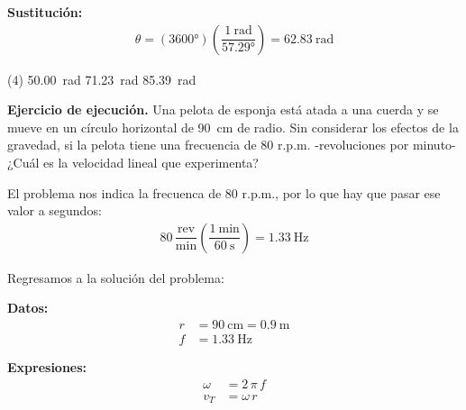 \documentclass[12pt, letter]{exam}
\begin{document}
\begin{questions}
    \vspace*{0.3cm}
    \textbf{Sustitución:}
    \begin{align*}
    \theta = \left( \ang{3600}  \right) \left( \dfrac{\SI{1}{\radian}}{\ang{57.29}} \right) = \SI{62.83}{\radian}
    \end{align*}
    \begin{tasks}(4)
        \task \SI{50.00}{\radian}
        \task {}
        \task \SI{71.23}{\radian}
        \task \SI{85.39}{\radian}
    \end{tasks}
    
    \setcounter{question}{11} \question \textbf{Ejercicio de ejecución.} Una pelota de esponja está atada a una cuerda y se mueve en un círculo horizontal de \SI{90}{\centi\meter} de radio. Sin considerar los efectos de la gravedad, si la pelota tiene una frecuencia de \num{80} r.p.m. -revoluciones por minuto- ¿Cuál es la velocidad lineal que experimenta?

    \vspace*{0.3cm}
    El problema nos indica la frecuenca de \num{80} r.p.m., por lo que hay que pasar ese valor a segundos:
    \begin{align*}
        80 \, \dfrac{\text{rev}}{\unit{\minute}} \left( \dfrac{\SI{1}{\minute}}{\SI{60}{\second}} \right) = \SI{1.33}{\hertz}
    \end{align*}
    
    Regresamos a la solución del problema:
    
    \vspace*{0.3cm}
    \begin{minipage}[t]{0.4\linewidth}
    \textbf{Datos:}
    \begin{align*}
    r &= \SI{90}{\centi\meter} = \SI{0.9}{\meter} \\
    f &= \SI{1.33}{\hertz}
    \end{align*}
    \end{minipage}
    \hspace{1cm}
    \begin{minipage}[t]{0.4\linewidth}
    \textbf{Expresiones:}
    \begin{align*}
    \omega &= 2 \, \pi \, f \\
    v_{T} &= \omega \, r
    \end{align*}
    \end{minipage}


\end{questions}
\end{document}
